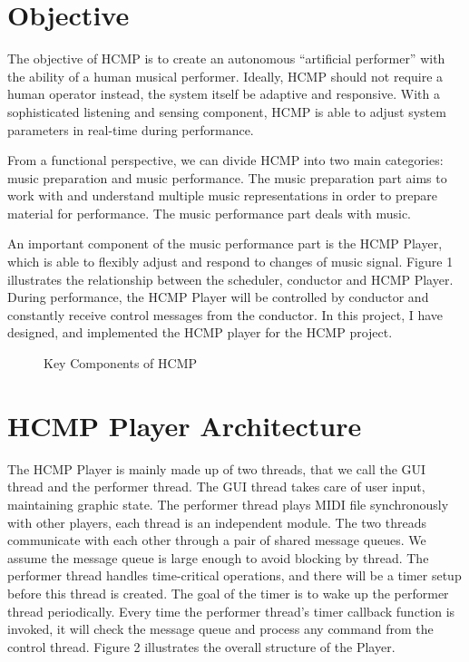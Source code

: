 \section{Objective}
The objective of HCMP \cite{Dawen:2011} is to create an autonomous 
``artificial performer'' with the ability of a human musical performer. 
Ideally, HCMP should not require a human operator instead, the system itself 
be adaptive and responsive. With a sophisticated listening and sensing
component, HCMP is able to adjust system parameters in real-time during 
performance. 

From a functional perspective, we can divide HCMP into two main
categories: music preparation and music performance. The music preparation
part aims to work with and understand multiple music representations in order
to prepare material for performance. The music
performance part deals with music.     

An important component of the music performance part is the HCMP Player, 
which is able to flexibly  
adjust and respond to changes of music signal. Figure 1 illustrates the relationship 
between the scheduler, conductor and HCMP Player. During performance, the HCMP Player will 
be controlled by conductor and constantly receive control messages 
from the conductor. In this project, I have designed, and implemented the HCMP player 
for the HCMP project.
\begin{figure}[H] %
\caption{Key Components of HCMP \cite{Dawen:2011}}
\end{figure}
 

\section{HCMP Player Architecture}
The HCMP Player is mainly made up of two threads, that we call the GUI thread 
and the performer thread. The GUI thread takes care of user input, maintaining 
graphic state. The performer thread plays MIDI file synchronously with other 
players, each thread is an independent 
module. The two threads communicate with each other through a pair of shared 
message queues. We assume the message 
queue is large enough to avoid blocking by thread. The performer thread
handles time-critical operations, and there will be a timer setup 
before this thread is created. The goal of the timer is to 
wake up the performer thread periodically. Every time the performer 
thread's timer callback function is invoked, 
it will check the message queue and process any command from the control thread.
Figure 2 illustrates the overall structure of the Player.

